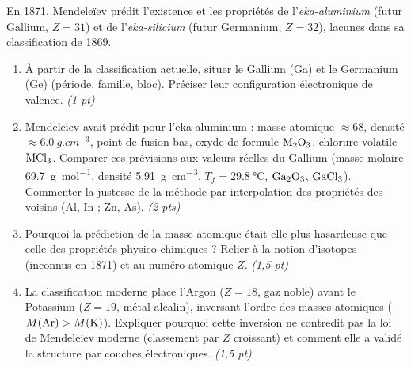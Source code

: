 \documentclass[11pt]{article}
\begin{document}
\begin{exercice}
En 1871, Mendeleïev prédit l'existence et les propriétés de l'\textit{eka-aluminium} (futur Gallium, $Z=31$) et de l'\textit{eka-silicium} (futur Germanium, $Z=32$), lacunes dans sa classification de 1869.
\begin{enumerate}
    \item À partir de la classification actuelle, situer le Gallium (Ga) et le Germanium (Ge) (période, famille, bloc). Préciser leur configuration électronique de valence. \textit{(1 pt)}
    \item Mendeleïev avait prédit pour l'eka-aluminium : masse atomique $\approx 68$, densité $\approx \SI{6.0}{g.cm^{-3}}$, point de fusion bas, oxyde de formule $\ce{M2O3}$, chlorure volatile $\ce{MCl3}$. Comparer ces prévisions aux valeurs réelles du Gallium (masse molaire \SI{69.7}{g.mol^{-1}}, densité \SI{5.91}{g.cm^{-3}}, $T_f = \SI{29.8}{\celsius}$, $\ce{Ga2O3}$, $\ce{GaCl3}$). Commenter la justesse de la méthode par interpolation des propriétés des voisins (Al, In ; Zn, As). \textit{(2 pts)}
    \item Pourquoi la prédiction de la masse atomique était-elle plus hasardeuse que celle des propriétés physico-chimiques ? Relier à la notion d'isotopes (inconnus en 1871) et au numéro atomique $Z$. \textit{(1,5 pt)}
    \item La classification moderne place l'Argon ($Z=18$, gaz noble) avant le Potassium ($Z=19$, métal alcalin), inversant l'ordre des masses atomiques ($M(\ce{Ar}) > M(\ce{K})$). Expliquer pourquoi cette inversion ne contredit pas la loi de Mendeleïev moderne (classement par $Z$ croissant) et comment elle a validé la structure par couches électroniques. \textit{(1,5 pt)}
\end{enumerate}
\end{exercice}
\end{document}
